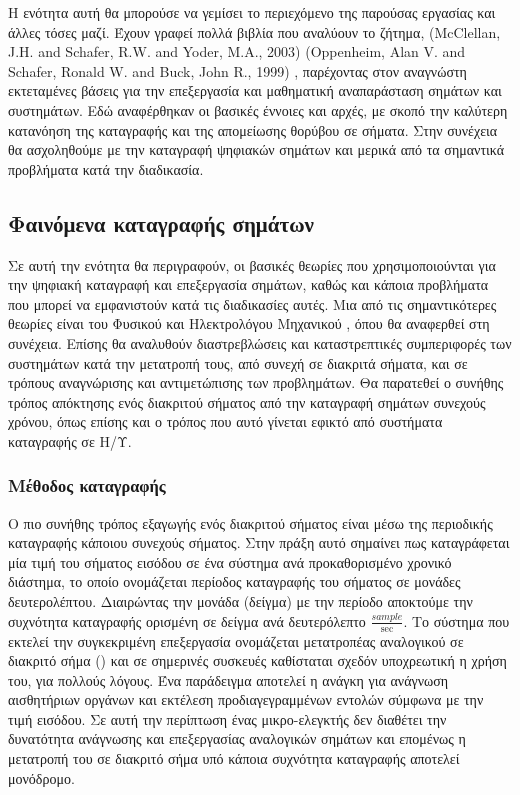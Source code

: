 \documentclass[11pt]{article}
\newcommand{\en}[1]{\selectlanguage{english}\text{#1}\selectlanguage{greek}}
\begin{document}
Η ενότητα αυτή θα μπορούσε να γεμίσει το περιεχόμενο της παρούσας εργασίας
και άλλες τόσες μαζί. Έχουν γραφεί πολλά βιβλία που αναλύουν το ζήτημα,
 (McClellan, J.H. and Schafer, R.W. and Yoder, M.A., 2003) (Oppenheim, Alan V. and Schafer, Ronald W. and Buck, John R., 1999)
,
παρέχοντας στον αναγνώστη εκτεταμένες βάσεις για την επεξεργασία
και μαθηματική αναπαράσταση σημάτων και συστημάτων. Εδώ αναφέρθηκαν οι βασικές
έννοιες και αρχές, με σκοπό την καλύτερη κατανόηση της καταγραφής και της
απομείωσης θορύβου σε σήματα. Στην συνέχεια θα ασχοληθούμε με την καταγραφή
ψηφιακών σημάτων και μερικά από τα σημαντικά προβλήματα κατά την διαδικασία.
\subsection{Φαινόμενα καταγραφής σημάτων}
\label{sec:org9b6fc31}
    Σε αυτή την ενότητα θα περιγραφούν, οι βασικές θεωρίες που χρησιμοποιούνται
για την ψηφιακή καταγραφή και επεξεργασία σημάτων, καθώς και κάποια προβλήματα
που μπορεί να εμφανιστούν κατά τις διαδικασίες αυτές. Μια από τις σημαντικότερες
θεωρίες είναι του Φυσικού και Ηλεκτρολόγου Μηχανικού \en{Harry\ Nyquist},
όπου θα αναφερθεί στη συνέχεια. Επίσης θα αναλυθούν διαστρεβλώσεις
και καταστρεπτικές συμπεριφορές των συστημάτων κατά την μετατροπή τους, από
συνεχή σε διακριτά σήματα, και σε τρόπους αναγνώρισης και αντιμετώπισης
των προβλημάτων. Θα παρατεθεί ο συνήθης τρόπος απόκτησης ενός διακριτού σήματος
από την καταγραφή σημάτων συνεχούς χρόνου, όπως επίσης και ο τρόπος που αυτό
γίνεται εφικτό από συστήματα καταγραφής σε Η/Υ.
\subsubsection{Μέθοδος καταγραφής}
\label{sec:org28b2f0a}
Ο πιο συνήθης τρόπος εξαγωγής ενός διακριτού σήματος είναι μέσω της περιοδικής
καταγραφής κάποιου συνεχούς σήματος. Στην πράξη αυτό σημαίνει πως καταγράφεται
μία τιμή του σήματος εισόδου σε ένα σύστημα ανά προκαθορισμένο χρονικό διάστημα,
το οποίο ονομάζεται περίοδος καταγραφής του σήματος σε μονάδες δευτερολέπτου.
Διαιρώντας την μονάδα (δείγμα) με την περίοδο αποκτούμε την συχνότητα καταγραφής ορισμένη
σε δείγμα ανά δευτερόλεπτο \(\displaystyle \frac{sample}{\sec}\). Το σύστημα που εκτελεί την συγκεκριμένη
επεξεργασία ονομάζεται μετατροπέας αναλογικού σε διακριτό σήμα (\en{D.A.C.})
και σε σημερινές συσκευές καθίσταται σχεδόν υποχρεωτική η χρήση του, για
πολλούς λόγους. Ένα παράδειγμα αποτελεί η ανάγκη για ανάγνωση αισθητήριων
οργάνων και εκτέλεση προδιαγεγραμμένων εντολών σύμφωνα με την τιμή εισόδου.
Σε αυτή την περίπτωση ένας μικρο-ελεγκτής δεν διαθέτει την δυνατότητα
ανάγνωσης και επεξεργασίας αναλογικών σημάτων και επομένως η μετατροπή του
σε διακριτό σήμα υπό κάποια συχνότητα καταγραφής αποτελεί μονόδρομο.
\end{document}
